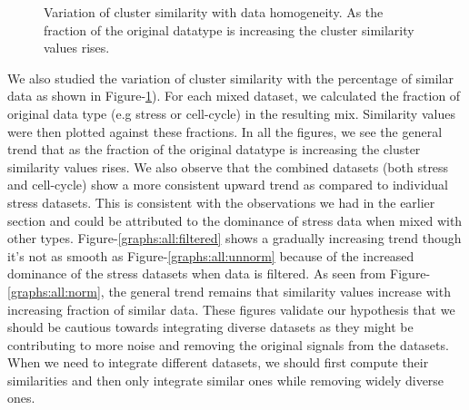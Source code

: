 \begin{figure}[p]

\caption[Variation of cluster similarity with data homogeneity]{Variation of cluster similarity with data homogeneity. As the fraction of the original datatype is increasing the 
cluster similarity values rises.}
\label{graphs:cluster_sim_homog}
\end{figure}

We also studied the variation of cluster similarity with the percentage of similar data as shown in Figure-\ref{graphs:cluster_sim_homog}). For each mixed dataset, we calculated 
the fraction of original data type (e.g stress or cell-cycle) in the resulting mix. 
Similarity values were then plotted against these fractions. In all the figures, we see the general trend that as the fraction of the original datatype is increasing the 
cluster similarity values rises. We also observe that the combined datasets (both stress and cell-cycle) show a more consistent upward trend as compared to 
individual stress datasets. This is consistent with the observations we had in the earlier section and could be attributed to the dominance of stress data when 
mixed with other types. Figure-\ref{graphs:all:filtered} 
shows a gradually increasing trend though it's not as smooth as Figure-\ref{graphs:all:unnorm} because of the increased dominance of the stress datasets when data is filtered. 
As seen from Figure-\ref{graphs:all:norm}, the general trend remains that similarity values increase with increasing fraction of similar data. These figures validate our hypothesis that we should be cautious towards integrating diverse datasets as they might be contributing to more noise and removing the original signals from the datasets. When we need to integrate different datasets, we should first compute their similarities and then only integrate similar ones while removing widely diverse ones.
